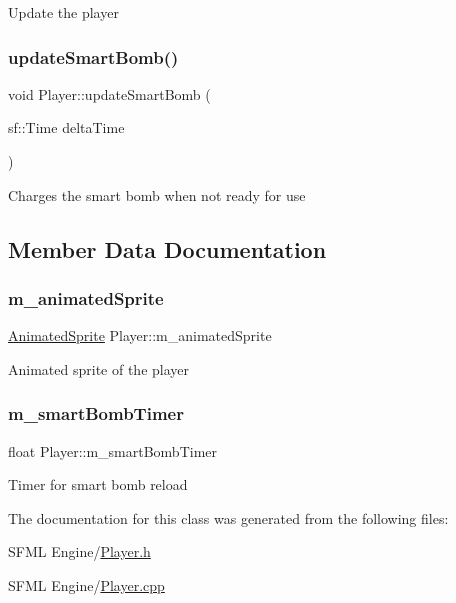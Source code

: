 Update the player \mbox{\label{class_player_a41a1a1a4f50f7a878ee22c92b42fd2b1}} 
\subsubsection{\texorpdfstring{update\+Smart\+Bomb()}{updateSmartBomb()}}
{\footnotesize\ttfamily void Player\+::update\+Smart\+Bomb (\begin{DoxyParamCaption}\item[{sf\+::\+Time}]{delta\+Time }\end{DoxyParamCaption})}

Charges the smart bomb when not ready for use 

\subsection{Member Data Documentation}
\mbox{\label{class_player_a6d6dfb4b46e5aa9eac78fd8cced73825}} 
\subsubsection{\texorpdfstring{m\+\_\+animated\+Sprite}{m\_animatedSprite}}
{\footnotesize\ttfamily \hyperlink{class_animated_sprite}{Animated\+Sprite} Player\+::m\+\_\+animated\+Sprite}

Animated sprite of the player \mbox{\label{class_player_adb6552419db92fdbc9aeda36e807c6ec}} 
\subsubsection{\texorpdfstring{m\+\_\+smart\+Bomb\+Timer}{m\_smartBombTimer}}
{\footnotesize\ttfamily float Player\+::m\+\_\+smart\+Bomb\+Timer}

Timer for smart bomb reload 

The documentation for this class was generated from the following files\+:\begin{DoxyCompactItemize}
\item 
S\+F\+M\+L Engine/\hyperlink{_player_8h}{Player.\+h}\item 
S\+F\+M\+L Engine/\hyperlink{_player_8cpp}{Player.\+cpp}\end{DoxyCompactItemize}
